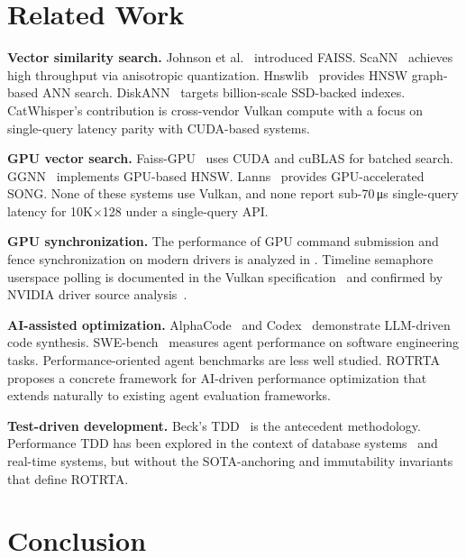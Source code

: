 \documentclass[conference]{IEEEtran}
\begin{document}
\section{Related Work}
\label{sec:related}

\textbf{Vector similarity search.}  Johnson et al.~\cite{johnson2019billion}
introduced FAISS.  ScaNN~\cite{guo2020accelerating} achieves high throughput
via anisotropic quantization.  Hnswlib~\cite{malkov2018efficient} provides
HNSW graph-based ANN search.  DiskANN~\cite{jayaram2019diskann} targets
billion-scale SSD-backed indexes.  CatWhisper's contribution is
cross-vendor Vulkan compute with a focus on single-query latency parity with
CUDA-based systems.

\textbf{GPU vector search.}  Faiss-GPU~\cite{johnson2019billion} uses CUDA
and cuBLAS for batched search.  GGNN~\cite{herrmann2021ggnn} implements
GPU-based HNSW.  Lanns~\cite{zhao2020song} provides GPU-accelerated SONG.
None of these systems use Vulkan, and none report sub-70\,\si{\micro\second}
single-query latency for 10K×128 under a single-query API.

\textbf{GPU synchronization.}  The performance of GPU command submission
and fence synchronization on modern drivers is analyzed in
\cite{schenk2020gpu}.  Timeline semaphore userspace polling is documented
in the Vulkan specification~\cite{vulkan2024spec} and confirmed by NVIDIA
driver source analysis~\cite{nvk2024}.

\textbf{AI-assisted optimization.}  AlphaCode~\cite{li2022competition}
and Codex~\cite{chen2021evaluating} demonstrate LLM-driven code synthesis.
SWE-bench~\cite{jimenez2023swe} measures agent performance on software
engineering tasks.  Performance-oriented agent benchmarks are less well
studied.  ROTRTA proposes a concrete framework for AI-driven performance
optimization that extends naturally to existing agent evaluation frameworks.

\textbf{Test-driven development.}  Beck's TDD~\cite{beck2003test} is the
antecedent methodology.  Performance TDD has been explored in the context
of database systems~\cite{padmanabhan2015perf} and real-time systems, but
without the SOTA-anchoring and immutability invariants that define ROTRTA.

\section{Conclusion}
\label{sec:conclusion}
\end{document}
